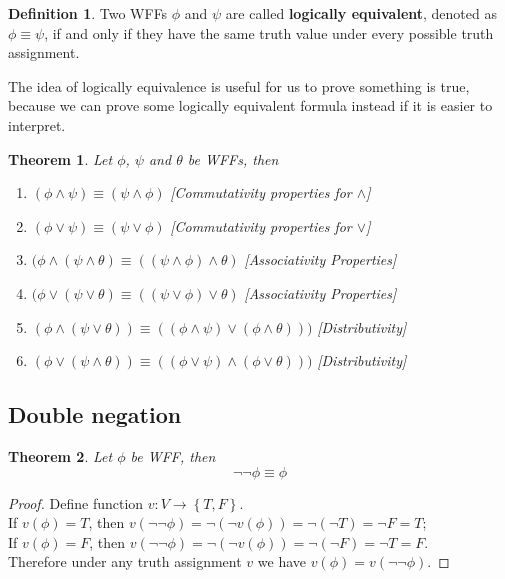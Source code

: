 \documentclass[11pt]{article}
\theoremstyle{definition}
\newtheorem{defn}{Definition}[subsection]
\newtheorem{theorem}{Theorem}[subsection]
\begin{document}
\begin{shaded}
\begin{defn}
    Two WFFs $\phi$ and $\psi$ are called \textbf{logically equivalent}, denoted as $\phi \equiv \psi$, if and only if they have the same truth value under every possible truth assignment. 
\end{defn}
\end{shaded}

The idea of logically equivalence is useful for us to prove something is true, because we can prove some logically equivalent formula instead if it is easier to interpret.
\begin{shaded}
\begin{theorem}
    \textit{Let $\phi$, $\psi$ and $\theta$ be WFFs, then}
    \begin{enumerate}
        \item $(\phi \wedge \psi) \equiv (\psi \wedge \phi)$ \textit{[Commutativity properties for $\wedge$]}
        \item $(\phi \vee \psi) \equiv (\psi \vee \phi)$ \textit{[Commutativity properties for $\vee$]}
        \item $(\phi \wedge (\psi \wedge \theta) \equiv ((\psi \wedge \phi) \wedge \theta)$ \textit{[Associativity Properties]}
        \item $(\phi \vee (\psi \vee \theta) \equiv ((\psi \vee \phi) \vee \theta)$ \textit{[Associativity Properties]}
        \item $(\phi \wedge (\psi \vee \theta)) \equiv ((\phi \wedge \psi) \vee (\phi \wedge \theta)))$ \textit{[Distributivity]}
        \item $(\phi \vee (\psi \wedge \theta)) \equiv ((\phi \vee \psi) \wedge (\phi \vee \theta)))$ \textit{[Distributivity]}
    \end{enumerate}
\end{theorem}
\end{shaded}

\subsection{Double negation}
\begin{shaded}
\begin{theorem}
    \textit{Let $\phi$ be WFF, then}
    \begin{equation}
        \neg \neg \phi \equiv \phi
    \end{equation}
\end{theorem}
\end{shaded}
\begin{proof}
    Define function $v: V \rightarrow \left\{T,F\right\}$.\\
    If $v(\phi)=T$, then $v(\neg \neg \phi)=\neg (\neg v(\phi))=\neg (\neg T)=\neg F=T$;\\
    If $v(\phi)=F$, then $v(\neg \neg \phi)=\neg (\neg v(\phi))=\neg (\neg F)=\neg T=F$.\\
    Therefore under any truth assignment $v$ we have $v(\phi)=v(\neg \neg \phi)$.
\end{proof}
\end{document}
